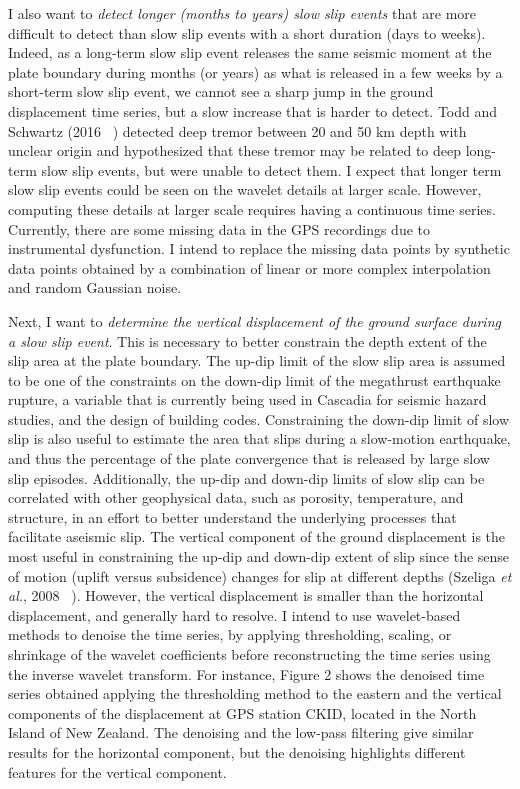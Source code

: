 \documentclass[letterpaper, 12pt]{article}
\begin{document}
I also want to \emph{detect longer (months to years) slow slip events} that are more difficult to detect than slow slip events with a short duration (days to weeks). Indeed, as a long-term slow slip event releases the same seismic moment at the plate boundary during months (or years) as what is released in a few weeks by a short-term slow slip event, we cannot see a sharp jump in the ground displacement time series, but a slow increase that is harder to detect. Todd and Schwartz (2016 ~\cite{TOD_2016}) detected deep tremor between 20 and 50 km depth with unclear origin and hypothesized that these tremor may be related to deep long-term slow slip events, but were unable to detect them. I expect that longer term slow slip events could be seen on the wavelet details at larger scale. However, computing these details at larger scale requires having a continuous time series. Currently, there are some missing data in the GPS recordings due to instrumental dysfunction. I intend to replace the missing data points by synthetic data points obtained by a combination of linear or more complex interpolation and random Gaussian noise.

Next, I want to \emph{determine the vertical displacement of the ground surface during a slow slip event}. This is necessary to better constrain the depth extent of the slip area at the plate boundary. The up-dip limit of the slow slip area is assumed to be one of the constraints on the down-dip limit of the megathrust earthquake rupture, a variable that is currently being used in Cascadia for seismic hazard studies, and the design of building codes. Constraining the down-dip limit of slow slip is also useful to estimate the area that slips during a slow-motion earthquake, and thus the percentage of the plate convergence that is released by large slow slip episodes. Additionally, the up-dip and down-dip limits of slow slip can be correlated with other geophysical data, such as porosity, temperature, and structure, in an effort to better understand the underlying processes that facilitate aseismic slip. The vertical component of the ground displacement is the most useful in constraining the up-dip and down-dip extent of slip since the sense of motion (uplift versus subsidence) changes for slip at different depths (Szeliga \textit{et al.}, 2008 ~\cite{SZE_2008}). However, the vertical displacement is smaller than the horizontal displacement, and generally hard to resolve. I intend to use wavelet-based methods to denoise the time series, by applying thresholding, scaling, or shrinkage of the wavelet coefficients before reconstructing the time series using the inverse wavelet transform. For instance, Figure 2 shows the denoised time series obtained applying the thresholding method to the eastern and the vertical components of the displacement at GPS station CKID, located in the North Island of New Zealand. The denoising and the low-pass filtering give similar results for the horizontal component, but the denoising highlights different features for the vertical component.
\end{document}
